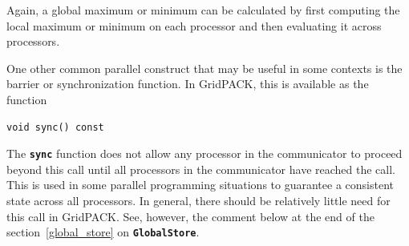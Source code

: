 Again, a global maximum or minimum can be calculated by first computing the
local maximum or minimum on each processor and then evaluating it across processors. 

One other common parallel construct that may be useful in some contexts is the barrier or synchronization function. In GridPACK, this is available as the function

{
\color{red}
\begin{Verbatim}[fontseries=b]
void sync() const
\end{Verbatim}
}

The \texttt{\textbf{sync}} function does not allow any processor in the
communicator to proceed beyond this call until all processors in the
communicator have reached the call. This is used in some parallel programming
situations to guarantee a consistent state across all processors.  In general,
there should be relatively little need for this call in GridPACK. See, however,
the comment below at the end of the section~\ref{global_store} on \texttt{\textbf{GlobalStore}}.
\newline
\hyperlink{topDoc}{\color{blue}{Top}}
